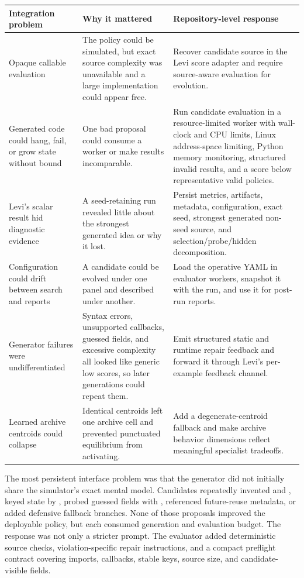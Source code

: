 \documentclass[11pt]{article}
\newcommand{\code}[1]{\texttt{\detokenize{#1}}}
\begin{document}
\begin{center}
\footnotesize
\begin{tabularx}{\textwidth}{@{}>{\raggedright\arraybackslash}p{}
  >{\raggedright\arraybackslash}X
  >{\raggedright\arraybackslash}X@{}}
\toprule
\textbf{Integration problem} & \textbf{Why it mattered} &
\textbf{Repository-level response} \\
\midrule
Opaque callable evaluation &
The policy could be simulated, but exact source complexity was unavailable and a large
implementation could appear free. &
Recover candidate source in the Levi score adapter and require source-aware evaluation
for evolution. \\
\addlinespace
Generated code could hang, fail, or grow state without bound &
One bad proposal could consume a worker or make results incomparable. &
Run candidate evaluation in a resource-limited worker with wall-clock and CPU limits,
Linux address-space limiting, Python memory monitoring,
structured invalid results, and a score below representative valid policies. \\
\addlinespace
Levi's scalar result hid diagnostic evidence &
A seed-retaining run revealed little about the strongest generated idea or why it
lost. &
Persist metrics, artifacts, metadata, configuration, exact seed, strongest generated
non-seed source, and selection/probe/hidden decomposition. \\
\addlinespace
Configuration could drift between search and reports &
A candidate could be evolved under one panel and described under another. &
Load the operative YAML in evaluator workers, snapshot it with the run, and use it for
post-run reports. \\
\addlinespace
Generator failures were undifferentiated &
Syntax errors, unsupported callbacks, guessed fields, and excessive complexity all
looked like generic low scores, so later generations could repeat them. &
Emit structured static and runtime repair feedback and forward it through Levi's
per-example feedback channel. \\
\addlinespace
Learned archive centroids could collapse &
Identical centroids left one archive cell and prevented punctuated equilibrium from
activating. &
Add a degenerate-centroid fallback and make archive behavior dimensions reflect
meaningful specialist tradeoffs. \\
\bottomrule
\end{tabularx}
\end{center}

The most persistent interface problem was that the generator did not initially share
the simulator's exact mental model.  Candidates repeatedly invented
\code{on_request_end} and \code{on_block_evicted}, keyed state by \code{id(block)},
probed guessed fields with \code{getattr}, referenced future-reuse metadata, or added
defensive fallback branches.  None of those proposals improved the deployable policy,
but each consumed generation and evaluation budget.  The response was not only a
stricter prompt.  The evaluator added deterministic source checks, violation-specific
repair instructions, and a compact preflight contract covering imports, callbacks,
stable keys, source size, and candidate-visible fields.
\end{document}
